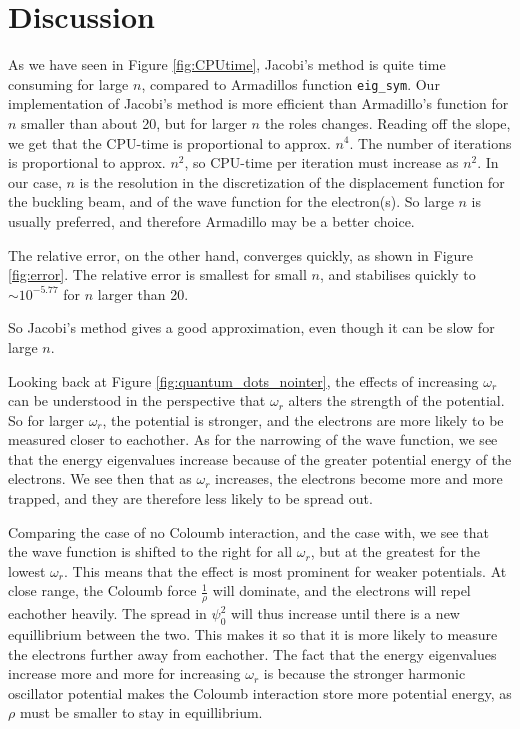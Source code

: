 \section{Discussion}
\label{sec:discussion}

As we have seen in Figure \ref{fig:CPUtime}, Jacobi's method is quite time consuming for large $n$, compared to Armadillos function \texttt{eig\_sym}.  Our implementation of Jacobi's method is more efficient than Armadillo's function for $n$ smaller than about 20, but for larger $n$ the roles changes. Reading off the slope, we get that the CPU-time is proportional to approx. $n^4$. The number of iterations is proportional to approx. $n^2$, so CPU-time per iteration must increase as $n^2$. In our case, $n$ is the resolution in the discretization of the displacement function for the buckling beam, and of the wave function for the electron(s). So large $n$ is usually preferred, and therefore Armadillo may be a better choice.

The relative error, on the other hand, converges quickly, as shown in Figure \ref{fig:error}. The relative error is smallest for small $n$, and stabilises quickly to $\sim10^{-5.77}$ for $n$ larger than 20.

So Jacobi's method gives a good approximation, even though it can be slow for large $n$.

Looking back at Figure \ref{fig:quantum_dots_nointer}, the effects of increasing
$\omega_r$ can be understood in the perspective that $\omega_r$ alters the strength
of the potential. So for larger $\omega_r$, the potential is stronger, and the electrons are more likely to be measured
closer to eachother. As for the narrowing of the wave function,
we see that the energy eigenvalues increase because of the greater potential energy
of the electrons. We see then that as $\omega_r$ increases, the electrons become
more and more trapped, and they are therefore less likely to be spread out.

Comparing the case of no Coloumb interaction, and the case with, we see that
the wave function is shifted to the right for all $\omega_r$, but at the greatest
for the lowest $\omega_r$. This means that the effect is most prominent for weaker
potentials. At close range, the Coloumb force $\frac{1}{\rho}$ will dominate,
and the electrons will repel eachother heavily. The spread in $\psi_0^2$ will thus increase
until there is a new equillibrium between the two. This makes it so that it is more likely to
measure the electrons further away from eachother. The fact that the energy eigenvalues
increase more and more for increasing $\omega_r$ is because the stronger harmonic oscillator
potential makes the Coloumb interaction store more potential energy, as $\rho$ must be smaller
to stay in equillibrium.

